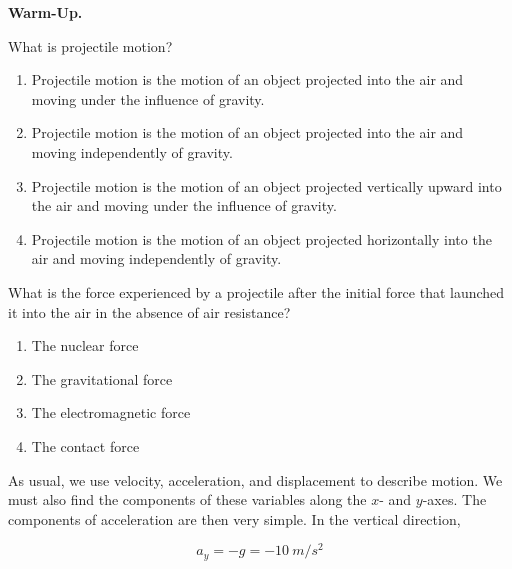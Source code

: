 \documentclass[main-physics.tex]{subfiles}
\begin{document}
\begin{mdframed}[backgroundcolor=csOrange]

\textbf{Warm-Up.}

\vspace{-1ex}

\begin{exercise} \label{nmtty2}
    What is projectile motion?
    
    \begin{enumerate}[label=\Alph*.]
        \item Projectile motion is the motion of an object projected into the air and moving under the influence of gravity.
        \item Projectile motion is the motion of an object projected into the air and moving independently of gravity.
        \item Projectile motion is the motion of an object projected vertically upward into the air and moving under the influence of gravity.
        \item Projectile motion is the motion of an object projected horizontally into the air and moving independently of gravity.
    \end{enumerate}
\end{exercise}

\begin{exercise} \label{uLtw6P}
    What is the force experienced by a projectile after the initial force that launched it into the air in the absence of air resistance?

    \begin{enumerate}[label=\Alph*.]
        \item The nuclear force
        \item The gravitational force
        \item The electromagnetic force
        \item The contact force
    \end{enumerate}
\end{exercise}
\end{mdframed}


As usual, we use velocity, acceleration, and displacement to describe motion. We must also find the components of these variables along the $x$- and $y$-axes. The components of acceleration are then very simple. In the vertical direction,

\begin{equation}
    a_y = -g = -\SI{10}{m/s^2}
\end{equation}
\end{document}

